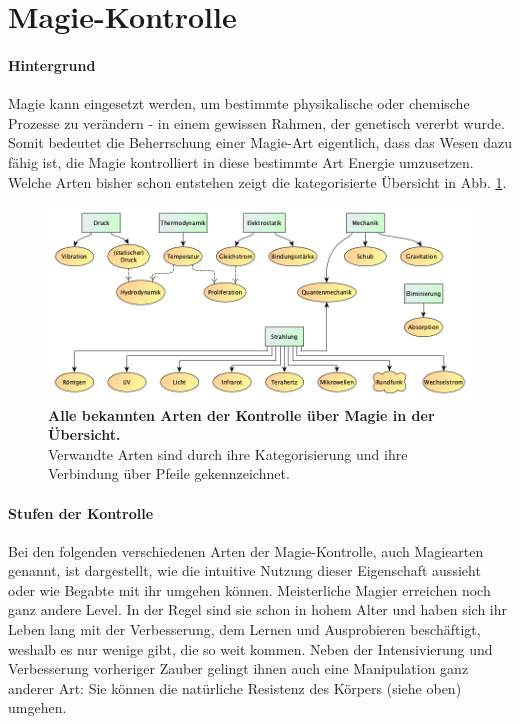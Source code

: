\section{Magie-Kontrolle}
\paragraph{Hintergrund}
Magie kann eingesetzt werden, um bestimmte physikalische oder chemische Prozesse zu verändern - in einem gewissen Rahmen, der genetisch vererbt wurde.
Somit bedeutet die Beherrschung einer Magie-Art eigentlich, dass das Wesen dazu fähig ist, die Magie kontrolliert in diese bestimmte Art Energie umzusetzen.
Welche Arten bisher schon entstehen zeigt die kategorisierte Übersicht in Abb. \ref{fig:magiearten-uebersicht}.

\begin{figure}[htb]
	\centering
	\includegraphics[width=\linewidth]{Abbildungen/Weltenbau/Magie/Magiearten-Uebersicht}
	\caption[Übersicht der Arten der Magiekontrolle]{\textbf{Alle bekannten Arten der Kontrolle über Magie in der Übersicht.} \\ 
	Verwandte Arten sind durch ihre Kategorisierung und ihre Verbindung über Pfeile gekennzeichnet.}
	\label{fig:magiearten-uebersicht}
\end{figure}


\paragraph{Stufen der Kontrolle}
Bei den folgenden verschiedenen Arten der Magie-Kontrolle, auch Magiearten genannt, ist dargestellt, wie die intuitive Nutzung dieser Eigenschaft aussieht oder wie Begabte mit ihr umgehen können.
Meisterliche Magier erreichen noch ganz andere Level. 
In der Regel sind sie schon in hohem Alter und haben sich ihr Leben lang mit der Verbesserung, dem Lernen und Ausprobieren beschäftigt, weshalb es nur wenige gibt, die so weit kommen. 
Neben der Intensivierung und Verbesserung vorheriger Zauber gelingt ihnen auch eine Manipulation ganz anderer Art: 
Sie können die natürliche Resistenz des Körpers (siehe oben) umgehen.


